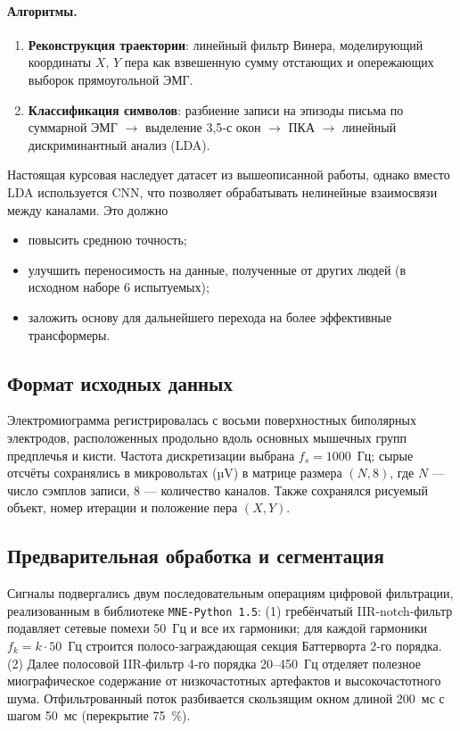 \documentclass[a4paper,12pt]{article}
\begin{document}
\paragraph{Алгоритмы.}
\begin{enumerate}
    \item \textbf{Реконструкция траектории}: линейный фильтр Винера, моделирующий координаты $X,\,Y$ пера как взвешенную сумму отстающих и опережающих выборок прямоугольной ЭМГ.
    \item \textbf{Классификация символов}: разбиение записи на эпизоды письма по суммарной ЭМГ $\rightarrow$ выделение 3{,}5‑с окон $\rightarrow$ ПКА $\rightarrow$ линейный дискриминантный анализ (LDA).
\end{enumerate}

Настоящая курсовая наследует датасет из вышеописанной работы, однако вместо LDA используется CNN, что позволяет обрабатывать нелинейные взаимосвязи между каналами. Это должно
\begin{itemize}
    \item повысить среднюю точность;
    \item улучшить переносимость на данные, полученные от других людей (в исходном наборе 6 испытуемых);
    \item заложить основу для дальнейшего перехода на более эффективные трансформеры.
\end{itemize}

\subsection{Формат исходных данных}
Электромиограмма регистрировалась с восьми поверхностных биполярных электродов, расположенных продольно вдоль основных мышечных групп предплечья и кисти. Частота дискретизации выбрана $f_{\!s}=1000$~Гц; сырые отсчёты сохранялись в микровольтах (µV) в матрице размера $(N,8)$, где $N$ — число сэмплов записи, 8 — количество каналов. Также сохранялся рисуемый объект, номер итерации и положение пера $(X, Y)$.

\subsection{Предварительная обработка и сегментация}
Сигналы подвергались двум последовательным операциям цифровой фильтрации, реализованным в библиотеке \texttt{MNE‑Python 1.5}: (1) гребёнчатый IIR‑notch‑фильтр подавляет сетевые помехи 50 Гц и все их гармоники; для каждой гармоники $f_k = k\cdot50$ Гц строится полосо‑заграждающая секция Баттерворта 2‑го порядка. (2) Далее полосовой IIR‑фильтр 4‑го порядка 20–450 Гц отделяет полезное миографическое содержание от низкочастотных артефактов и высокочастотного шума. Отфильтрованный поток разбивается скользящим окном длиной 200 мс с шагом 50 мс (перекрытие 75~\%).
\end{document}
